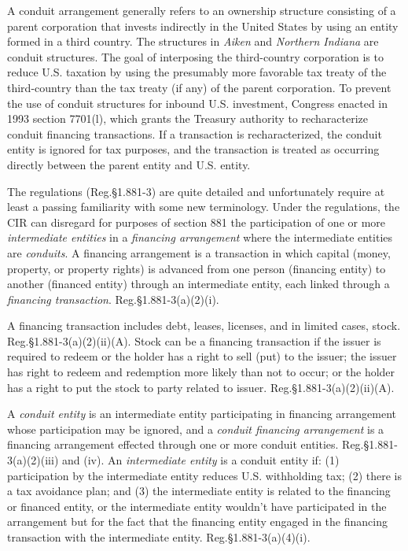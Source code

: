 A conduit arrangement generally refers to an ownership structure consisting of a parent corporation that invests indirectly in the United States by using an entity formed in a third country.  The structures in \emph{Aiken} and \emph{Northern Indiana} are conduit structures.  The goal of interposing the third-country corporation is to reduce U.S. taxation by using the presumably more favorable tax treaty of the third-country than the tax treaty (if any) of the parent corporation.  To prevent the use of conduit structures for inbound U.S. investment, Congress enacted in 1993 section 7701(l), which grants the Treasury authority to recharacterize conduit financing transactions.  If a transaction is recharacterized, the conduit entity is ignored for tax purposes, and the transaction is treated as occurring directly between the parent entity and U.S. entity.  

The regulations (Reg.\@ \S1.881-3) are quite detailed and unfortunately require at least a passing familiarity with some new terminology.  Under the regulations, the CIR can disregard for purposes of section 881 the participation of one or more \emph{intermediate entities} in a \emph{financing arrangement} where the intermediate entities are \emph{conduits}.  A financing arrangement is a transaction in which capital (money, property, or property rights) is advanced from one person (financing entity) to another (financed entity) through an intermediate entity, each linked through a \emph{financing transaction}.  Reg.\@ \S1.881-3(a)(2)(i).  

A financing transaction includes debt, leases, licenses, and in limited cases, stock.   Reg.\@ \S1.881-3(a)(2)(ii)(A).  Stock can be a financing transaction if the issuer is required to redeem or the holder has a right to sell (put) to the issuer; the issuer has right to redeem and redemption more likely than not to occur; or the holder has a right to put the stock to party related to issuer.   Reg.\@ \S1.881-3(a)(2)(ii)(A).

A \emph{conduit entity} is an intermediate entity participating in financing arrangement whose participation may be ignored, and a \emph{conduit financing arrangement} is a financing arrangement effected through one or more conduit entities. Reg.\@ \S1.881-3(a)(2)(iii) and (iv).  An \emph{intermediate entity} is a conduit entity if:  (1) participation by the intermediate entity reduces U.S. withholding tax; (2) there is a tax avoidance plan; and (3) the intermediate entity is related to the financing or financed entity, or the intermediate entity wouldn't have participated in the arrangement but for the fact that the financing entity engaged in the financing transaction with the intermediate entity. Reg.\@ \S1.881-3(a)(4)(i). 

